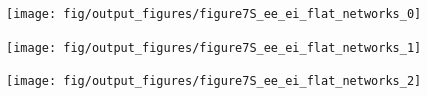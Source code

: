 \documentclass[a4paper,12pt]{article}
\begin{document}
\clearpage

\begin{figure}[p!]
    \internallinenumbers
    \centering
        \texttt{[image: fig/output\_figures/figure7S\_ee\_ei\_flat\_networks\_0]}
\end{figure}

\clearpage

\begin{figure}[p!]
    \internallinenumbers
    \centering
        \texttt{[image: fig/output\_figures/figure7S\_ee\_ei\_flat\_networks\_1]}
\end{figure}

\begin{figure}[p!]
    \internallinenumbers
    \centering
        \texttt{[image: fig/output\_figures/figure7S\_ee\_ei\_flat\_networks\_2]}
    \caption{}
\end{figure}

\clearpage
\end{document}
